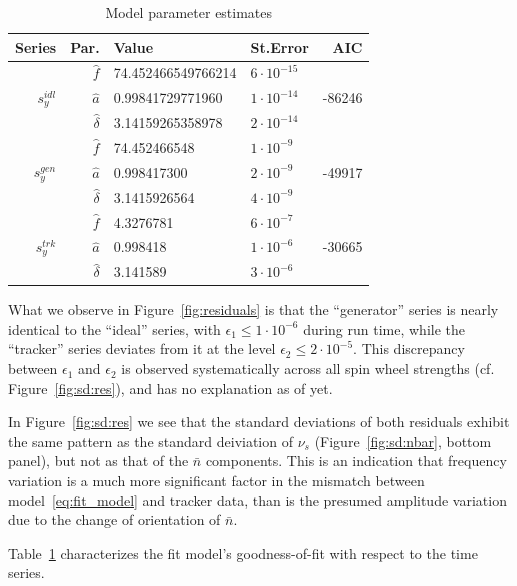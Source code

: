 \documentclass[a4paper]{jacow}
\newcommand{\nbar}{\bar n}
\begin{document}
\begin{table}[h]
  \caption{Model parameter estimates\label{tbl:param_estimates}}
  \begin{tabular}{r|rllr}
    \toprule
    Series & Par. & Value & St.Error & AIC \\
    \midrule
    \multirow{3}{*}{$s_y^{idl}$} & $\hat f$ & 74.452466549766214 & $6\cdot10^{-15}$ & \multirow{3}{*}{-86246} \\
    & $\hat a$ & 0.99841729771960 & $1\cdot10^{-14}$ & \\
    & $\hat\delta$ & 3.14159265358978 & $2\cdot 10^{-14}$ &\\
    \hline
    \multirow{3}{*}{$s_y^{gen}$} & $\hat f$ & 74.452466548 & $1\cdot 10^{-9}$ & \multirow{3}{*}{-49917} \\
    & $\hat a$ & 0.998417300 & $2\cdot 10^{-9}$ & \\
    & $\hat\delta$ & 3.1415926564 & $4\cdot 10^{-9}$ &\\
    \hline
    \multirow{3}{*}{$s_y^{trk}$} & $\hat f$ & 4.3276781 & $6\cdot 10^{-7}$ & \multirow{3}{*}{-30665} \\
    & $\hat a$ & 0.998418 & $1\cdot10^{-6}$ & \\
    & $\hat\delta$ & 3.141589 & $3\cdot 10^{-6}$ &\\
    \bottomrule
  \end{tabular}
\end{table}

What we observe in Figure~\ref{fig:residuals} is that the ``generator'' series is nearly identical
to the ``ideal'' series, with $\epsilon_1 \le 1\cdot10^{-6}$ during run time,
while the ``tracker'' series deviates from it at the level
$\epsilon_2 \le 2\cdot 10^{-5}$. This discrepancy between $\epsilon_1$ and $\epsilon_2$ is observed
systematically across all spin wheel strengths (cf. Figure~\ref{fig:sd:res}), and has no explanation as of yet.

In Figure~\ref{fig:sd:res} we see that the standard deviations of both residuals exhibit the same pattern as
the standard deiviation of $\nu_s$ (Figure~\ref{fig:sd:nbar}, bottom panel), but not as that of
the $\nbar$ components. This is an indication that frequency variation is a much more significant factor
in the mismatch between model~\eqref{eq:fit_model} and tracker data, than is the presumed amplitude variation
due to the change of orientation of $\nbar$.

Table~\ref{tbl:param_estimates} characterizes the fit model's goodness-of-fit with respect to the time series.
\end{document}
